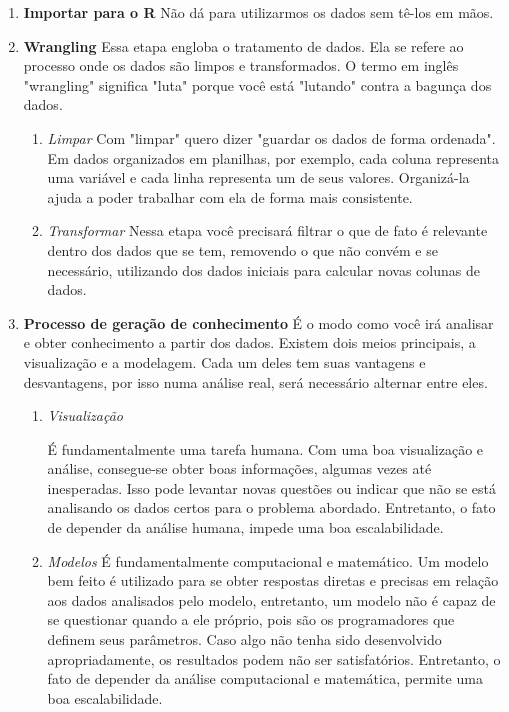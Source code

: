       \begin{enumerate}
        \item \textbf{Importar para o R}
          Não dá para utilizarmos os dados sem tê-los em mãos.
        \item \textbf{Wrangling}
          Essa etapa engloba o tratamento de dados. Ela se refere ao processo onde os dados são limpos e transformados. O termo em inglês "wrangling" significa "luta" porque você está "lutando" contra a bagunça dos dados.
        \begin{enumerate}
          \item \textit{Limpar}
            Com "limpar" quero dizer "guardar os dados de forma ordenada". Em dados organizados em planilhas, por exemplo, cada coluna representa uma variável e cada linha representa um de seus valores.
            Organizá-la ajuda a poder trabalhar com ela de forma mais consistente.
          \item \textit{Transformar}
            Nessa etapa você precisará filtrar o que de fato é relevante dentro dos dados que se tem, removendo o que não convém e se necessário, utilizando dos dados iniciais para calcular novas colunas de dados.
        \end{enumerate}
        \item \textbf{Processo de geração de conhecimento}
          É o modo como você irá analisar e obter conhecimento a partir dos dados. Existem dois meios principais, a visualização e a modelagem. Cada um deles tem suas vantagens e desvantagens, por isso numa análise real, será necessário alternar entre eles.
        \begin{enumerate}

          \item \textit{Visualização}

            É fundamentalmente uma tarefa humana. Com uma boa visualização e análise, consegue-se obter boas informações, algumas vezes até inesperadas. Isso pode levantar novas questões ou indicar que não se está analisando os dados certos para o problema abordado. Entretanto, o fato de depender da análise humana, impede uma boa escalabilidade.
          \item \textit{Modelos}
            É fundamentalmente computacional e matemático. Um modelo bem feito é utilizado para se obter respostas diretas e precisas em relação aos dados analisados pelo modelo, entretanto, um modelo não é capaz de se questionar quando a ele próprio, pois são os programadores que definem seus parâmetros. Caso algo não tenha sido desenvolvido apropriadamente, os resultados podem não ser satisfatórios. Entretanto, o fato de depender da análise computacional e matemática, permite uma boa escalabilidade.
        \end{enumerate}

      \end{enumerate}


